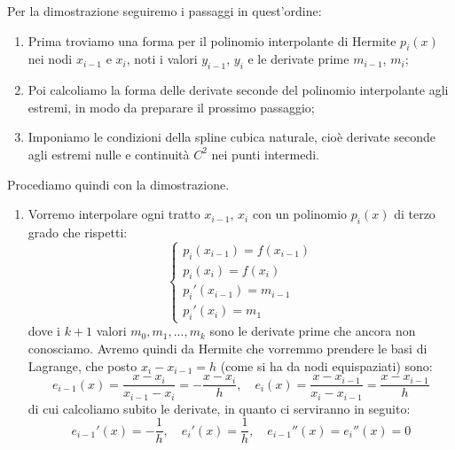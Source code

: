 \documentclass[a4paper,11pt]{article}
\begin{document}
\begin{itemize}
		Per la dimostrazione seguiremo i passaggi in quest'ordine:
		\begin{enumerate}
			\item Prima troviamo una forma per il polinomio interpolante di Hermite $p_i(x)$ nei nodi $x_{i - 1}$ e $x_{i}$, noti i valori $y_{i - 1}$, $y_i$ e le derivate prime $m_{i - 1}$, $m_i$;
			\item Poi calcoliamo la forma delle derivate seconde del polinomio interpolante agli estremi, in modo da preparare il prossimo passaggio;
			\item Imponiamo le condizioni della spline cubica naturale, cioè derivate seconde agli estremi nulle e continuità $C^2$ nei punti intermedi.
		\end{enumerate}

		Procediamo quindi con la dimostrazione.

		\begin{enumerate}
			\item 
				Vorremo interpolare ogni tratto $x_{i - 1}$, $x_i$ con un polinomio $p_i(x)$ di terzo grado che rispetti:
				\[
					\begin{cases}
						p_i(x_{i - 1}) = f(x_{i - 1}) \\
						p_i(x_i) = f(x_i) \\
						p_i'(x_{i - 1}) = m_{i - 1} \\
						p_i'(x_i) = m_1
					\end{cases}
				\]
				dove i $k + 1$ valori $m_0, m_1, ..., m_k$ sono le derivate prime che ancora non conosciamo.
				Avremo quindi da Hermite che vorremmo prendere le basi di Lagrange, che posto $x_i - x_{i - 1} = h$ (come si ha da nodi equispaziati) sono:
				$$
				e_{i-1}(x) = \frac{x - x_i}{x_{i-1} - x_i} = -\frac{x - x_i}{h}, \quad e_i(x) = \frac{x - x_{i-1}}{x_i - x_{i-1}} = \frac{x - x_{i - 1}}{h}
				$$
				di cui calcoliamo subito le derivate, in quanto ci serviranno in seguito:
				$$
				e_{i-1}'(x) = -\frac{1}{h}, \quad e_{i}'(x) = \frac{1}{h}, \quad e_{i - 1}''(x) = e_{i}''(x) = 0
				$$


\end{enumerate}
\end{itemize}
\end{document}
